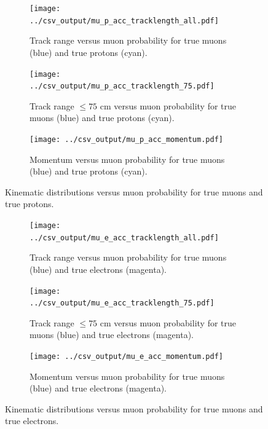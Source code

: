 \begin{figure}[htp]
\centering
	\begin{subfigure}[b]{.475\textwidth}
		\centering
		\texttt{[image: ../csv\_output/mu\_p\_acc\_tracklength\_all.pdf]}
		\caption{Track range versus muon probability for true muons (blue) and true protons (cyan).}
		\label{fig:mup_tracklength}
	\end{subfigure}
	\begin{subfigure}[b]{.475\textwidth}
		\centering
		\texttt{[image: ../csv\_output/mu\_p\_acc\_tracklength\_75.pdf]}
		\caption{Track range $\leq 75$ cm versus muon probability for true muons (blue) and true protons (cyan).}
		\label{fig:mup_tracklength75}
	\end{subfigure}
	\begin{subfigure}[b]{.475\textwidth}
		\centering
		\texttt{[image: ../csv\_output/mu\_p\_acc\_momentum.pdf]}
		\caption{Momentum versus muon probability for true muons (blue) and true protons (cyan).}
		\label{fig:mup_momentum}
	\end{subfigure}
\caption{Kinematic distributions versus muon probability for true muons and true protons.}
\label{fig:mup_kinematics}
\end{figure}

\begin{figure}[htp]
\centering
	\begin{subfigure}[b]{.475\textwidth}
		\centering
		\texttt{[image: ../csv\_output/mu\_e\_acc\_tracklength\_all.pdf]}
		\caption{Track range versus muon probability for true muons (blue) and true electrons (magenta).}
		\label{fig:mue_tracklength}
	\end{subfigure}
	\begin{subfigure}[b]{.475\textwidth}
		\centering
		\texttt{[image: ../csv\_output/mu\_e\_acc\_tracklength\_75.pdf]}
		\caption{Track range $\leq 75$ cm versus muon probability for true muons (blue) and true electrons (magenta).}
		\label{fig:mue_tracklength75}
	\end{subfigure}
	\begin{subfigure}[b]{.475\textwidth}
		\centering
		\texttt{[image: ../csv\_output/mu\_e\_acc\_momentum.pdf]}
		\caption{Momentum versus muon probability for true muons (blue) and true electrons (magenta).}
		\label{fig:mue_momentum}
	\end{subfigure}
\caption{Kinematic distributions versus muon probability for true muons and true electrons.}
\label{fig:mue_kinematics}
\end{figure}

